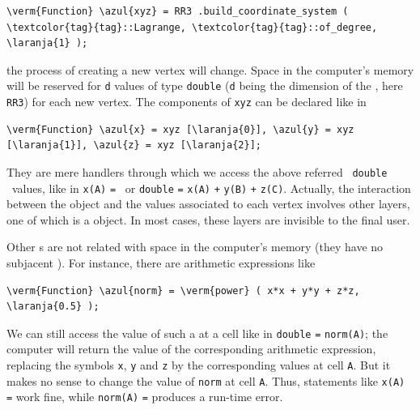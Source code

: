 \begin{Verbatim}[commandchars=\\\{\},formatcom=\small\tt,baselinestretch=0.94]
   \verm{Function} \azul{xyz} = RR3 .build_coordinate_system ( \textcolor{tag}{tag}::Lagrange, \textcolor{tag}{tag}::of_degree, \laranja{1} );
\end{Verbatim}

\noindent the process of creating a new vertex will change.
Space in the computer's memory will be reserved for {\small\tt d} values of type
{\small\tt double} ({\small\tt d} being the dimension of the {\small\tt{}},
here {\small\tt RR3}) for each new vertex.
The components of {\small\tt xyz} can be declared like in

\begin{Verbatim}[commandchars=\\\{\},formatcom=\small\tt,baselinestretch=0.94]
   \verm{Function} \azul{x} = xyz [\laranja{0}], \azul{y} = xyz [\laranja{1}], \azul{z} = xyz [\laranja{2}];
\end{Verbatim}

\noindent They are mere handlers through which we access the above referred \ {\small\tt double}
\ values, like in {\small\tt x(A)} {\small\tt =} {\small\tt {}}\ or
{\small\tt double} {\small\tt {}} {\small\tt =} {\small\tt x(A)} {\small\tt +}
{\small\tt y(B)} {\small\tt +} {\small\tt z(C)}.
Actually, the interaction between the {\small\tt{}} object and the values
associated to each vertex involves other layers, one of which is a {\small\tt{}}
object.
In most cases, these layers are invisible to the final user.

Other {\small\tt{}}s are not related with space in the computer's memory
(they have no subjacent {\small\tt{}}).
For instance, there are arithmetic expressions like 

\begin{Verbatim}[commandchars=\\\{\},formatcom=\small\tt,baselinestretch=0.94]
   \verm{Function} \azul{norm} = \verm{power} ( x*x + y*y + z*z, \laranja{0.5} );
\end{Verbatim}

We can still access the value of such a {\small\tt {}} at a cell like in
{\small\tt double} {\small\tt {}} {\small\tt =} {\small\tt norm(A)};
the computer will return the value of the corresponding arithmetic expression,
replacing the symbols {\small\tt x}, {\small\tt y} and {\small\tt z} by the corresponding
values at cell {\small\tt A}.
But it makes no sense to change the value of {\small\tt norm} at cell {\small\tt A}.
Thus, statements like {\small\tt x(A)} {\small\tt =} {\small\tt {}} work fine,
while {\small\tt norm(A)} {\small\tt =} {\small\tt {}} produces a run-time error.
\vfil\eject

